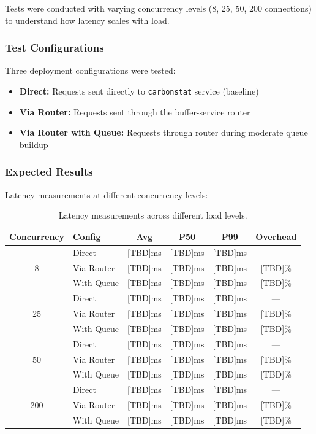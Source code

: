 Tests were conducted with varying concurrency levels (8, 25, 50, 200 connections) to understand how latency scales with load.

\subsubsection{Test Configurations}

Three deployment configurations were tested:

\begin{itemize}
    \item \textbf{Direct:} Requests sent directly to \texttt{carbonstat} service (baseline)
    \item \textbf{Via Router:} Requests sent through the buffer-service router
    \item \textbf{Via Router with Queue:} Requests through router during moderate queue buildup
\end{itemize}

\subsubsection{Expected Results}

Latency measurements at different concurrency levels:

\begin{table}[h]
\centering
\begin{tabular}{|c|l|c|c|c|c|}
\hline
\rowcolor{lightgray}
\textbf{Concurrency} & \textbf{Config} & \textbf{Avg} & \textbf{P50} & \textbf{P99} & \textbf{Overhead} \\
\hline
\multirow{3}{*}{8} & Direct & [TBD]ms & [TBD]ms & [TBD]ms & --- \\
& Via Router & [TBD]ms & [TBD]ms & [TBD]ms & [TBD]\% \\
& With Queue & [TBD]ms & [TBD]ms & [TBD]ms & [TBD]\% \\
\hline
\multirow{3}{*}{25} & Direct & [TBD]ms & [TBD]ms & [TBD]ms & --- \\
& Via Router & [TBD]ms & [TBD]ms & [TBD]ms & [TBD]\% \\
& With Queue & [TBD]ms & [TBD]ms & [TBD]ms & [TBD]\% \\
\hline
\multirow{3}{*}{50} & Direct & [TBD]ms & [TBD]ms & [TBD]ms & --- \\
& Via Router & [TBD]ms & [TBD]ms & [TBD]ms & [TBD]\% \\
& With Queue & [TBD]ms & [TBD]ms & [TBD]ms & [TBD]\% \\
\hline
\multirow{3}{*}{200} & Direct & [TBD]ms & [TBD]ms & [TBD]ms & --- \\
& Via Router & [TBD]ms & [TBD]ms & [TBD]ms & [TBD]\% \\
& With Queue & [TBD]ms & [TBD]ms & [TBD]ms & [TBD]\% \\
\hline
\end{tabular}
\caption{Latency measurements across different load levels.}
\label{table:latency-measurements}
\end{table}

